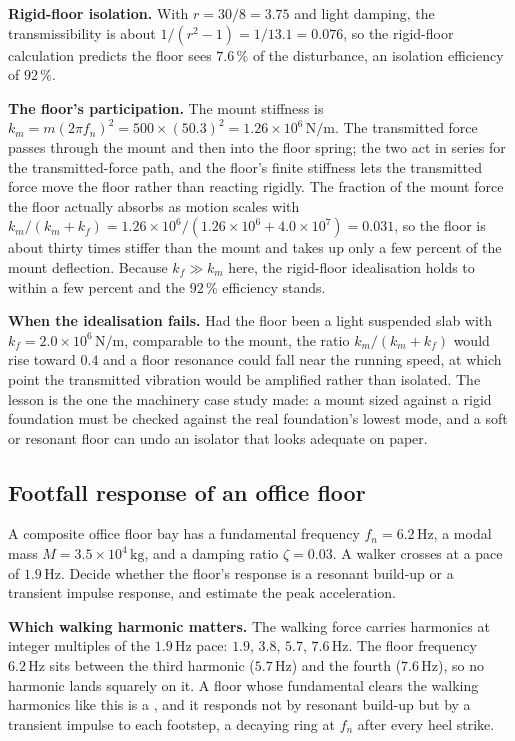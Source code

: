 \textbf{Rigid-floor isolation.} With $r = 30/8 = 3.75$ and light
damping, the transmissibility is about $1/(r^2 - 1) = 1/13.1 = 0.076$,
so the rigid-floor calculation predicts the floor sees $7.6\,\%$ of the
disturbance, an isolation efficiency of $92\,\%$.

\textbf{The floor's participation.} The mount stiffness is $k_m =
m(2\pi f_n)^2 = 500\times (50.3)^2 = 1.26\times 10^6\,\si{\newton\per
\meter}$. The transmitted force passes through the mount and then into
the floor spring; the two act in series for the transmitted-force path,
and the floor's finite stiffness lets the transmitted force move the
floor rather than reacting rigidly. The fraction of the mount force the
floor actually absorbs as motion scales with $k_m/(k_m + k_f) =
1.26\times 10^6/(1.26\times 10^6 + 4.0\times 10^7) = 0.031$, so the
floor is about thirty times stiffer than the mount and takes up only a
few percent of the mount deflection. Because $k_f \gg k_m$ here, the
rigid-floor idealisation holds to within a few percent and the $92\,\%$
efficiency stands.

\textbf{When the idealisation fails.} Had the floor been a light
suspended slab with $k_f = 2.0\times 10^6\,\si{\newton\per\meter}$,
comparable to the mount, the ratio $k_m/(k_m + k_f)$ would rise toward
$0.4$ and a floor resonance could fall near the running speed, at which
point the transmitted vibration would be amplified rather than isolated.
The lesson is the one the machinery case study made: a mount sized
against a rigid foundation must be checked against the real foundation's
lowest mode, and a soft or resonant floor can undo an isolator that
looks adequate on paper.

\subsection{Footfall response of an office floor}

A composite office floor bay has a fundamental frequency $f_n = 6.2\,\si{
\hertz}$, a modal mass $M = 3.5\times 10^4\,\si{\kilogram}$, and a
damping ratio $\zeta = 0.03$. A walker crosses at a pace of $1.9\,\si{
\hertz}$. Decide whether the floor's response is a resonant build-up or
a transient impulse response, and estimate the peak acceleration.

\textbf{Which walking harmonic matters.} The walking force carries
harmonics at integer multiples of the $1.9\,\si{\hertz}$ pace: $1.9$,
$3.8$, $5.7$, $7.6\,\si{\hertz}$. The floor frequency $6.2\,\si{\hertz}$
sits between the third harmonic ($5.7\,\si{\hertz}$) and the fourth
($7.6\,\si{\hertz}$), so no harmonic lands squarely on it. A floor whose
fundamental clears the walking harmonics like this is a
, and it responds not by resonant build-up
but by a transient impulse to each footstep, a decaying ring at $f_n$
after every heel strike.

